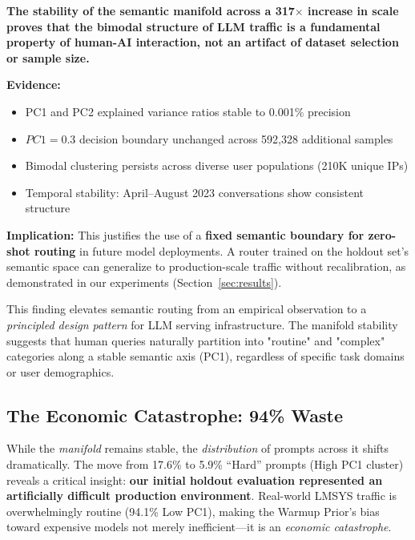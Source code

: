 \begin{tcolorbox}[colback=blue!5!white,colframe=blue!75!black,title=\textbf{Claim: Bimodal Structure as a Fundamental Property}]
\textbf{The stability of the semantic manifold across a 317$\times$ increase in scale proves that the bimodal structure of LLM traffic is a fundamental property of human-AI interaction, not an artifact of dataset selection or sample size.}

\textbf{Evidence:}
\begin{itemize}[noitemsep,topsep=2pt]
    \item PC1 and PC2 explained variance ratios stable to 0.001\% precision
    \item $PC1 = 0.3$ decision boundary unchanged across 592,328 additional samples
    \item Bimodal clustering persists across diverse user populations (210K unique IPs)
    \item Temporal stability: April--August 2023 conversations show consistent structure
\end{itemize}

\textbf{Implication:} This justifies the use of a \textbf{fixed semantic boundary for zero-shot routing} in future model deployments. A router trained on the holdout set's semantic space can generalize to production-scale traffic without recalibration, as demonstrated in our experiments (Section~\ref{sec:results}).
\end{tcolorbox}

This finding elevates semantic routing from an empirical observation to a \emph{principled design pattern} for LLM serving infrastructure. The manifold stability suggests that human queries naturally partition into "routine" and "complex" categories along a stable semantic axis (PC1), regardless of specific task domains or user demographics.

\subsection{The Economic Catastrophe: 94\% Waste}

While the \emph{manifold} remains stable, the \emph{distribution} of prompts across it shifts dramatically. The move from 17.6\% to 5.9\% ``Hard'' prompts (High PC1 cluster) reveals a critical insight: \textbf{our initial holdout evaluation represented an artificially difficult production environment}. Real-world LMSYS traffic is overwhelmingly routine (94.1\% Low PC1), making the Warmup Prior's bias toward expensive models not merely inefficient---it is an \emph{economic catastrophe}.

